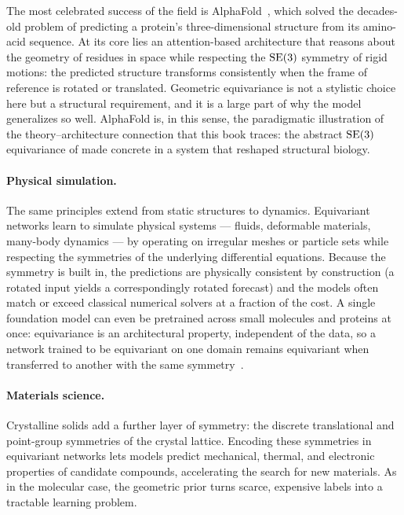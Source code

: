 \begin{example}
\label{ex:apps:alphafold}
The most celebrated success of the field is
AlphaFold~\citep{jumper2021alphafold}, which solved the decades-old problem of
predicting a protein's three-dimensional structure from its amino-acid sequence.
At its core lies an attention-based architecture that reasons about the geometry
of residues in space while respecting the $\mathrm{SE}(3)$ symmetry of rigid motions:
the predicted structure transforms consistently when the frame of reference is
rotated or translated. Geometric equivariance is not a stylistic choice here but
a structural requirement, and it is a large part of why the model generalizes so
well. AlphaFold is, in this sense, the paradigmatic illustration of the
theory--architecture connection that this book traces: the abstract $\mathrm{SE}(3)$
equivariance of  made concrete in a system that reshaped
structural biology.
\end{example}

\paragraph{Physical simulation.}
The same principles extend from static structures to dynamics. Equivariant
networks learn to simulate physical systems --- fluids, deformable materials,
many-body dynamics --- by operating on irregular meshes or particle sets while
respecting the symmetries of the underlying differential equations. Because the
symmetry is built in, the predictions are physically consistent by construction
(a rotated input yields a correspondingly rotated forecast) and the models often
match or exceed classical numerical solvers at a fraction of the cost. A single
foundation model can even be pretrained across small molecules and proteins at
once: equivariance is an architectural property, independent of the data, so a
network trained to be equivariant on one domain remains equivariant when
transferred to another with the same symmetry~\citep{jiao2024ept}.

\paragraph{Materials science.}
Crystalline solids add a further layer of symmetry: the discrete translational
and point-group symmetries of the crystal lattice. Encoding these symmetries in
equivariant networks lets models predict mechanical, thermal, and electronic
properties of candidate compounds, accelerating the search for new materials. As
in the molecular case, the geometric prior turns scarce, expensive labels into a
tractable learning problem.

